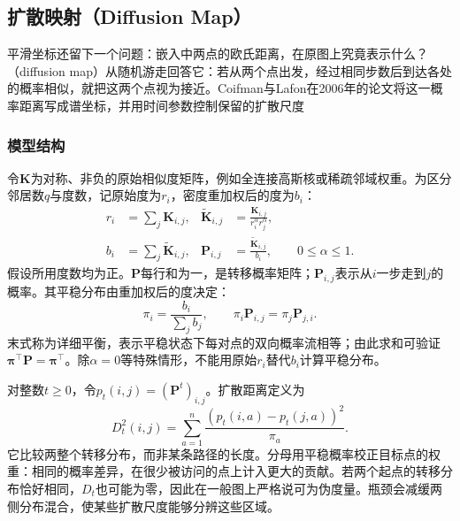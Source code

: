 \subsection{扩散映射（Diffusion Map）}
\label{sec:dim-diffusion}

平滑坐标还留下一个问题：嵌入中两点的欧氏距离，在原图上究竟表示什么？（diffusion map）从随机游走回答它：若从两个点出发，经过相同步数后到达各处的概率相似，就把这两个点视为接近。Coifman与Lafon在2006年的论文将这一概率距离写成谱坐标，并用时间参数控制保留的扩散尺度

\subsubsection{模型结构}

令$\bm{K}$为对称、非负的原始相似度矩阵，例如全连接高斯核或稀疏邻域权重。为区分邻居数$q$与度数，记原始度为$r_i$，密度重加权后的度为$b_i$：
\begin{equation}
  \label{eq:dim-diffusion-normalization}
  \begin{aligned}
    r_i&=\sum_j\bm{K}_{i,j},&
    \widetilde{\bm{K}}_{i,j}
      &=\frac{\bm{K}_{i,j}}{r_i^\alpha r_j^\alpha},\\
    b_i&=\sum_j\widetilde{\bm{K}}_{i,j},&
    \bm{P}_{i,j}&=\frac{\widetilde{\bm{K}}_{i,j}}{b_i},
    \qquad 0\leq\alpha\leq1.
  \end{aligned}
\end{equation}
假设所用度数均为正。$\bm{P}$每行和为一，是转移概率矩阵；$\bm{P}_{i,j}$表示从$i$一步走到$j$的概率。其平稳分布由重加权后的度决定：
\begin{equation}
  \label{eq:dim-diffusion-stationary}
  \pi_i=\frac{b_i}{\sum_j b_j},
  \qquad
  \pi_i\bm{P}_{i,j}=\pi_j\bm{P}_{j,i}.
\end{equation}
末式称为详细平衡，表示平稳状态下每对点的双向概率流相等；由此求和可验证$\bm{\pi}^{\top}\bm{P}=\bm{\pi}^{\top}$。除$\alpha=0$等特殊情形，不能用原始$r_i$替代$b_i$计算平稳分布。

对整数$t\geq0$，令$p_t(i,j)=(\bm{P}^t)_{i,j}$。扩散距离定义为
\begin{equation}
  \label{eq:dim-diffusion-distance}
  D_t^2(i,j)
  =\sum_{a=1}^n\frac{(p_t(i,a)-p_t(j,a))^2}{\pi_a}.
\end{equation}
它比较两整个转移分布，而非某条路径的长度。分母用平稳概率校正目标点的权重：相同的概率差异，在很少被访问的点上计入更大的贡献。若两个起点的转移分布恰好相同，$D_t$也可能为零，因此在一般图上严格说可为伪度量。瓶颈会减缓两侧分布混合，使某些扩散尺度能够分辨这些区域。

